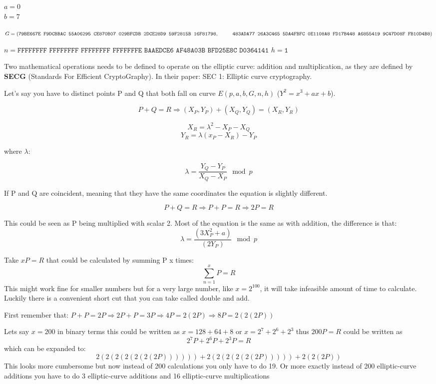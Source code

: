 $a=0$\\
$b=7$

$G=(\texttt{79BE667E F9DCBBAC 55A06295 CE870B07 029BFCDB 2DCE28D9 59F2815B 16F81798},\\ \null\qquad\:\:\: 
\texttt{483ADA77 26A3C465 5DA4FBFC 0E1108A8 FD17B448 A6855419 9C47D08F FB10D4B8})$


$n=\texttt{FFFFFFFF FFFFFFFF FFFFFFFF FFFFFFFE BAAEDCE6 AF48A03B BFD25E8C D0364141}$
$h=\texttt{1}$

Two mathematical operations needs to be defined to operate on the elliptic curve: 
addition and multiplication, as they are defined by \textbf{SECG} (Standards For Efficient CryptoGraphy). In their paper: SEC 1: Elliptic curve cryptography.\cite{ecc_def}

Let's say you have to distinct points P and Q that both fall on curve $E(p,a,b,G,n,h)$ 
($Y^2=x^3+ax+b$). 

$$P+Q=R \Rightarrow (X_P, Y_P) + (X_Q, Y_Q) = (X_R, Y_R)$$

$$X_R = \lambda^2-X_P-X_Q$$
$$Y_R = \lambda(x_P-X_R) -Y_P$$

where $\lambda$:

$$\lambda = \frac{Y_Q-Y_P}{X_Q - X_P} \mod p$$

If P and Q are coincident, meaning that they have the same coordinates the equation 
is slightly different. 

$$P+Q=R \Rightarrow P+P=R \Rightarrow 2P=R$$ 

This could be seen as P being multiplied with scalar 2. Most of the equation is the same 
as with addition, the difference is that:\\
$$\lambda = \frac{(3X^2_P + a)}{(2Y_P)} \mod p$$

Take $xP=R$ that could be calculated by summing P x times:
$$\sum_{n=1}^{x} P = R$$
This might work fine for smaller numbers but for a very large number, like $x=2^{100}$, it will 
take infeasible amount of time to calculate. Luckily there is a convenient short cut that you 
can take called double and add. 

First remember that: $P+P = 2P \Rightarrow 2P + P = 3P \Rightarrow 4P = 2(2P) \Rightarrow 8P = 2(2(2P))$

Lets say $x=200$ in binary terms this could be written as $x=128+64+8$ or $x=2^7+2^6+2^3$ 
thus $200P=R$ could be written as 
$$2^7P+2^6P+2^3P=R$$ 
which can be expanded to: 
$$2(2(2(2(2(2(2P)))))) + 2(2(2(2(2(2P))))) + 2(2(2P))$$ 
This looks more cumbersome but now instead of 200 calculations you only have to do 19. Or more exactly instead of 200 elliptic-curve additions you have to do 3 elliptic-curve additions and 16 elliptic-curve multiplications


